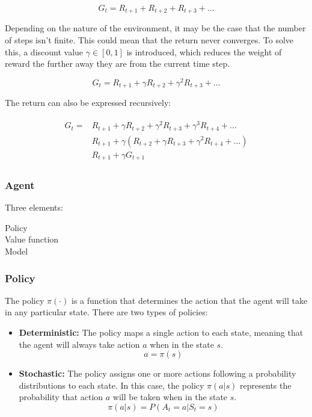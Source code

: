 \begin{equation}
    G_t = R_{t+1} + R_{t+2} + R_{t+3} + \ldots
\end{equation}

Depending on the nature of the environment, it may be the case that the number of steps isn't finite. This could mean that the return never converges. To solve this, a discount value $\gamma \in [0,1]$ is introduced, which reduces the weight of reward the further away they are from the current time step.

\begin{equation}
    G_t = R_{t+1} + \gamma R_{t+2} + \gamma^2 R_{t+3} + \ldots
\end{equation}

The return can also be expressed recursively:

\begin{align}
\begin{split}
    G_t = &R_{t+1} + \gamma R_{t+2} + \gamma^2 R_{t+3}  + \gamma^3 R_{t+4} + \ldots\\
    &R_{t+1} + \gamma(R_{t+2} + \gamma R_{t+3} + \gamma^2 R_{t+4} + \ldots)\\
    &R_{t+1} + \gamma G_{t+1}
\end{split}
\end{align}


\subsubsection{Agent}

Three elements:

\begin{description}
    \item[Policy]
    \item[Value function]
    \item[Model]
\end{description}

\subsubsection*{Policy}

The policy $\pi(\cdot)$ is a function that determines the action that the agent will take in any particular state. There are two types of policies:

\begin{itemize}
    \item \textbf{Deterministic:} The policy maps a single action to each state, meaning that the agent will always take action $a$ when in the state $s$.
    \begin{equation}
        a = \pi(s)
    \end{equation}
    \item \textbf{Stochastic:} The policy assigns one or more actions following a probability distributions to each state. In this case, the policy $\pi(a|s)$ represents the probability that action $a$ will be taken when in the state $s$.
    \begin{equation}
        \pi(a|s) = P(A_t=a|S_t=s)
    \end{equation}
\end{itemize}

